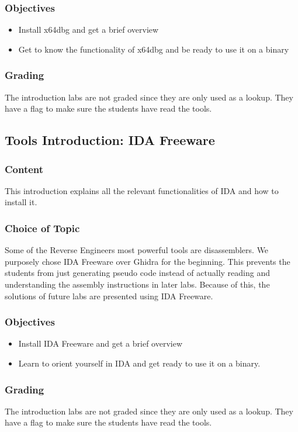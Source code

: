 \subsubsection*{Objectives}
\begin{itemize}
    \item Install x64dbg and get a brief overview
    \item Get to know the functionality of x64dbg and be ready to use it on a binary
\end{itemize}
\subsubsection*{Grading}
The introduction labs are not graded since they are only used as a lookup. They have a flag to make sure the students have read the tools.

\subsection{Tools Introduction: IDA Freeware}
\subsubsection*{Content}
This introduction explains all the relevant functionalities of IDA and how to install it.
\subsubsection*{Choice of Topic}
Some of the Reverse Engineers most powerful tools are disassemblers. We purposely chose IDA Freeware over Ghidra for the beginning. This prevents the students from just generating pseudo code instead of actually reading and understanding the assembly instructions in later labs. Because of this, the solutions of future labs are presented using IDA Freeware.
\subsubsection*{Objectives}
\begin{itemize}
    \item Install IDA Freeware and get a brief overview
    \item Learn to orient yourself in IDA and get ready to use it on a binary.
\end{itemize}
\subsubsection*{Grading}
The introduction labs are not graded since they are only used as a lookup. They have a flag to make sure the students have read the tools.

